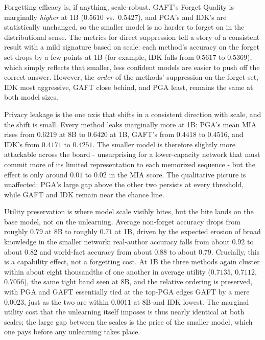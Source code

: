 \documentclass[a4paper,12pt]{report}
\begin{document}
Forgetting efficacy is, if anything, scale-robust. GAFT's Forget Quality is marginally \emph{higher} at 1B ($0.5610$ vs.\ $0.5427$), and PGA's and IDK's are statistically unchanged, so the smaller model is no harder to forget on in the distributional sense. The metrics for direct suppression tell a story of a consistent result with a mild signature based on scale: each method's accuracy on the forget set drops by a few points at 1B (for example, IDK falls from $0.5617$ to $0.5369$), which simply reflects that smaller, less confident models are easier to push off the correct answer. However, the \emph{order} of the methods' suppression on the forget set, IDK most aggressive, GAFT close behind, and PGA least, remains the same at both model sizes.

Privacy leakage is the one axis that shifts in a consistent direction with scale, and the shift is small. Every method leaks marginally more at 1B: PGA's mean MIA rises from $0.6219$ at 8B to $0.6420$ at 1B, GAFT's from $0.4418$ to $0.4516$, and IDK's from $0.4171$ to $0.4251$. The smaller model is therefore slightly more attackable across the board - unsurprising for a lower-capacity network that must commit more of its limited representation to each memorized sequence - but the effect is only around $0.01$ to $0.02$ in the MIA score. The qualitative picture is unaffected: PGA's large gap above the other two persists at every threshold, while GAFT and IDK remain near the chance line.

Utility preservation is where model scale visibly bites, but the bite lands on the base model, not on the unlearning. Average non-forget accuracy drops from roughly $0.79$ at 8B to roughly $0.71$ at 1B, driven by the expected erosion of broad knowledge in the smaller network: real-author accuracy falls from about $0.92$ to about $0.82$ and world-fact accuracy from about $0.88$ to about $0.79$. Crucially, this is a capability effect, not a forgetting cost. At 1B the three methods again cluster within about eight thousandths of one another in average utility ($0.7135$, $0.7112$, $0.7056$), the same tight band seen at 8B, and the relative ordering is preserved, with PGA and GAFT essentially tied at the top-PGA edges GAFT by a mere $0.0023$, just as the two are within $0.0011$ at 8B-and IDK lowest. The marginal utility cost that the unlearning itself imposes is thus nearly identical at both scales; the large gap between the scales is the price of the smaller model, which one pays before any unlearning takes place.
\end{document}
